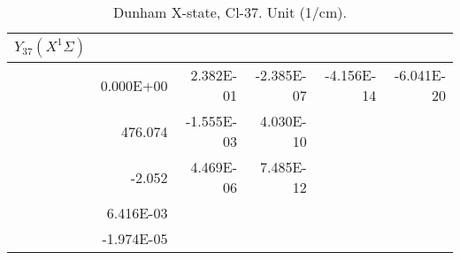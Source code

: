 \begin{table}[h]
\begin{tabular}{crrrrr}
\toprule
$Y_{37} (X^1\Sigma)$\\ \midrule 
& 0.000E+00 & 2.382E-01 & -2.385E-07 & -4.156E-14 & -6.041E-20 \\
& 476.074 & -1.555E-03 & 4.030E-10 \\
& -2.052 & 4.469E-06 & 7.485E-12 \\
& 6.416E-03 \\
& -1.974E-05 \\
\bottomrule
\end{tabular}\caption{Dunham X-state, Cl-37. Unit (1/cm).}\end{table}
